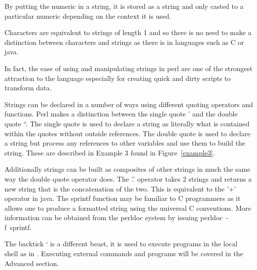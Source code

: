 \documentclass{article}
\begin{document}
By putting the numeric in a string, it is stored as a string and
only casted to a particular numeric depending on the context it is
used.
\par
Characters are equivalent to strings of length 1 and so there is no
need to make a distinction between characters and strings as there is
in languages such as C or java.
\par 
In fact, the ease of using and manipulating strings in perl are one of
the strongest attraction to the language especially for creating quick
and dirty scripts to transform data.
\par
 Strings can be declared in a number of ways using different quoting
operators and functions.  Perl makes a distinction between the single
quote ' and the double quote ``.  The single quote is used to declare
a string as literally what is contained within the quotes without
outside references.  The double quote is used to declare a string but
process any references to other variables and use them to build the
string.  These are described in Example 3 found in Figure~\ref{example3}.
\par
Additionally strings can be built as composites of other strings in
much the same way the double quote operator does.  The '.' operator
takes 2 strings and returns a new string that is the concatenation of
the two.  This is equivalent to the '+' operator in java.  The sprintf
function may be familiar to C programmers as it allows one to produce
a formatted string using the universal C conventions.  More
information can be obtained from the perldoc system by issuing
perldoc~-f~sprintf.
\par
The backtick ` is a different beast, it is used to execute
programs in the local shell as in .
Executing external commands and programs will be covered in the
Advanced section.
\end{document}

